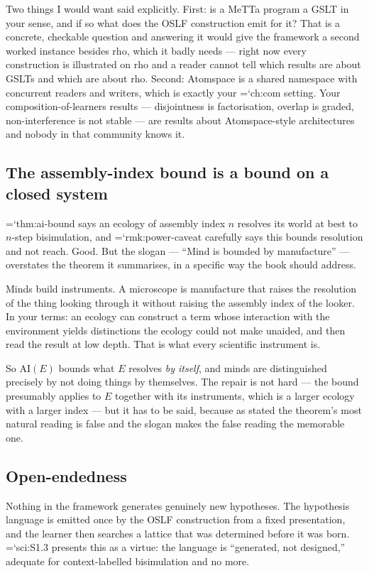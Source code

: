 \documentclass[11pt,letterpaper]{article}
\newcommand{\loc}[1]{{\small\ttfamily\color{accent}\hyphenchar\font=`\-\relax #1}}
\newcommand{\AI}{\mathrm{AI}}
\begin{document}
Two things I would want said explicitly. First: is a MeTTa program a
GSLT in your sense, and if so what does the OSLF construction emit for
it? That is a concrete, checkable question and answering it would give
the framework a second worked instance besides rho, which it badly
needs --- right now every construction is illustrated on rho and a
reader cannot tell which results are about GSLTs and which are about
rho. Second: Atomspace is a shared namespace with concurrent readers
and writers, which is exactly your \loc{ch:com} setting. Your
composition-of-learners results --- disjointness is factorisation,
overlap is graded, non-interference is not stable --- are results about
Atomspace-style architectures and nobody in that community knows it.

\subsection*{The assembly-index bound is a bound on a closed system}

\loc{thm:ai-bound} says an ecology of assembly index $n$ resolves its
world at best to $n$-step bisimulation, and
\loc{rmk:power-caveat} carefully says this bounds resolution and not
reach. Good. But the slogan --- ``Mind is bounded by manufacture'' ---
overstates the theorem it summarises, in a specific way the book should
address.

Minds build instruments. A microscope is manufacture that raises the
resolution of the thing looking through it without raising the
assembly index of the looker. In your terms: an ecology can construct a
term whose interaction with the environment yields distinctions the
ecology could not make unaided, and then read the result at low depth.
That is what every scientific instrument is.

So $\AI(E)$ bounds what $E$ resolves \emph{by itself}, and minds are
distinguished precisely by not doing things by themselves. The repair
is not hard --- the bound presumably applies to $E$ together with its
instruments, which is a larger ecology with a larger index --- but it
has to be said, because as stated the theorem's most natural reading is
false and the slogan makes the false reading the memorable one.

\subsection*{Open-endedness}

Nothing in the framework generates genuinely new hypotheses. The
hypothesis language is emitted once by the OSLF construction from a
fixed presentation, and the learner then searches a lattice that was
determined before it was born. \loc{sci:S1.3} presents this as a
virtue: the language is ``generated, not designed,'' adequate for
context-labelled bisimulation and no more.
\end{document}
